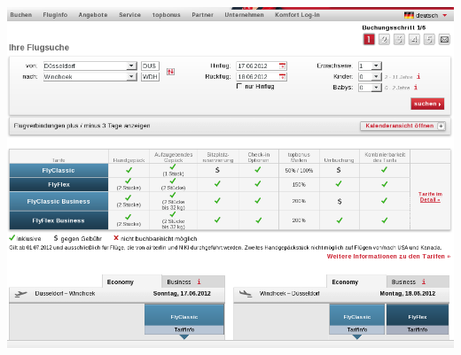 \documentclass[11pt]{article}
\begin{document}
\includegraphics[scale=0.45]{Flug_Air_Berlin/Bildschirmfoto_am_2012-06-13_14_47_43.png} 
\end{document}
